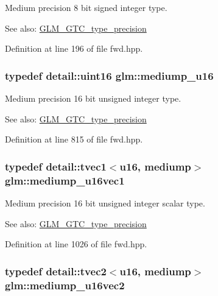 Medium precision 8 bit signed integer type. \begin{Desc}
\item[See also:]\hyperlink{group__gtc__type__precision}{GLM\_\-GTC\_\-type\_\-precision} \end{Desc}


Definition at line 196 of file fwd.hpp.\hypertarget{group__gtc__type__precision_g6745262ef6a6fdb8637b2387ef924828}{
\subsubsection[mediump\_\-u16]{\setlength{\rightskip}{0pt plus 5cm}typedef detail::uint16 {\bf glm::mediump\_\-u16}}}
\label{group__gtc__type__precision_g6745262ef6a6fdb8637b2387ef924828}


Medium precision 16 bit unsigned integer type. \begin{Desc}
\item[See also:]\hyperlink{group__gtc__type__precision}{GLM\_\-GTC\_\-type\_\-precision} \end{Desc}


Definition at line 815 of file fwd.hpp.\hypertarget{group__gtc__type__precision_gcb35d25d662b2a6396d094197ca834f0}{
\subsubsection[mediump\_\-u16vec1]{\setlength{\rightskip}{0pt plus 5cm}typedef detail::tvec1$<$u16, mediump$>$ {\bf glm::mediump\_\-u16vec1}}}
\label{group__gtc__type__precision_gcb35d25d662b2a6396d094197ca834f0}


Medium precision 16 bit unsigned integer scalar type. \begin{Desc}
\item[See also:]\hyperlink{group__gtc__type__precision}{GLM\_\-GTC\_\-type\_\-precision} \end{Desc}


Definition at line 1026 of file fwd.hpp.\hypertarget{group__gtc__type__precision_g93fe5ddc21391f0334eb3a60b76c390b}{
\subsubsection[mediump\_\-u16vec2]{\setlength{\rightskip}{0pt plus 5cm}typedef detail::tvec2$<$u16, mediump$>$ {\bf glm::mediump\_\-u16vec2}}}
\label{group__gtc__type__precision_g93fe5ddc21391f0334eb3a60b76c390b}


